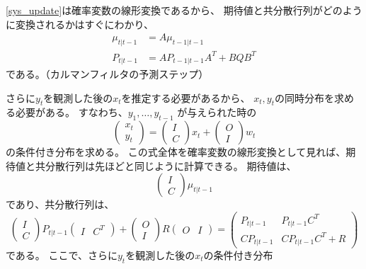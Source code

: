 \documentclass[textwidth-limit=45]{bxjsarticle}
\begin{document}
\eqref{sys_update}は確率変数の線形変換であるから、
期待値と共分散行列がどのように変換されるかはすぐにわかり、
\begin{align}
  \mu_{t|t-1} &= A \mu_{t-1|t-1} \\
  P_{t|t-1} &= A P_{t-1|t-1} A^T + B Q B^T
\end{align}
である。（カルマンフィルタの予測ステップ）

さらに$y_t$を観測した後の$x_t$を推定する必要があるから、
$x_t, y_t$の同時分布を求める必要がある。
すなわち、$y_1, \dots, y_{t-1}$ が与えられた時の
\begin{equation}
  \begin{pmatrix}
    x_t \\
    y_t
  \end{pmatrix} =
  \begin{pmatrix}
    I \\
    C
  \end{pmatrix} x_t +
  \begin{pmatrix}
    O \\
    I
  \end{pmatrix} w_t
\end{equation}
の条件付き分布を求める。
この式全体を確率変数の線形変換として見れば、期待値と共分散行列は先ほどと同じように計算できる。
期待値は、
\begin{equation}
  \begin{pmatrix}
    I \\
    C
  \end{pmatrix} \mu_{t|t-1}
\end{equation}
であり、共分散行列は、
\begin{equation}
  \begin{pmatrix}
    I \\
    C
  \end{pmatrix} P_{t|t-1}
  \begin{pmatrix}
    I & C^T
  \end{pmatrix} + 
  \begin{pmatrix}
    O \\
    I
  \end{pmatrix} R
  \begin{pmatrix}
    O & I
  \end{pmatrix} =
  \begin{pmatrix}
    P_{t|t-1} & P_{t|t-1} C^T \\
    C P_{t|t-1} & C P_{t|t-1} C^T + R
  \end{pmatrix}
\end{equation}
である。
ここで、さらに$y_t$を観測した後の$x_t$の条件付き分布
\end{document}
